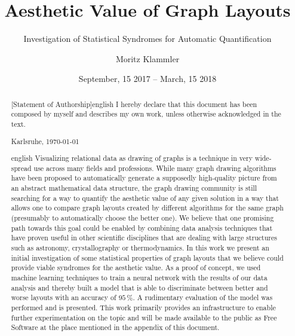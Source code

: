 \documentclass{graphstudy}
\title{Aesthetic Value of Graph Layouts}
\subtitle{Investigation of Statistical Syndromes for Automatic Quantification}
\author{Moritz Klammler}
\date{September, 15 2017 -- March, 15 2018}
\begin{document}
\frontmatter
\maketitle
\cleardoublepage

\vspace*{\fill}
\begin{abstract}[Statement of Authorship]{english}
  I hereby declare that this document has been composed by myself and describes my own work, unless otherwise
  acknowledged in the text.
  \par\vspace{2.5cm}
  Karlsruhe, \today
\end{abstract}
\vspace{2cm}
\cleardoublepage

\begin{abstract}{english}
  Visualizing relational data as drawing of graphs is a technique in very wide-spread use across many fields and
  professions.  While many graph drawing algorithms have been proposed to automatically generate a supposedly
  high-quality picture from an abstract mathematical data structure, the graph drawing community is still searching for
  a way to quantify the aesthetic value of any given solution in a way that allows one to compare graph layouts created
  by different algorithms for the same graph (presumably to automatically choose the better one).  We believe that one
  promising path towards this goal could be enabled by combining data analysis techniques that have proven useful in
  other scientific disciplines that are dealing with large structures such as astronomy, crystallography or
  thermodynamics.  In this work we present an initial investigation of some statistical properties of graph layouts that
  we believe could provide viable syndromes for the aesthetic value.  As a proof of concept, we used machine learning
  techniques to train a neural network with the results of our data analysis and thereby built a model that is able to
  discriminate between better and worse layouts with an accuracy of \(95\,\%\).  A rudimentary evaluation of the model
  was performed and is presented.  This work primarily provides an infrastructure to enable further experimentation on
  the topic and will be made available to the public as Free Software at the place mentioned in the appendix of this
  document.
\end{abstract}
\clearpage
\end{document}
